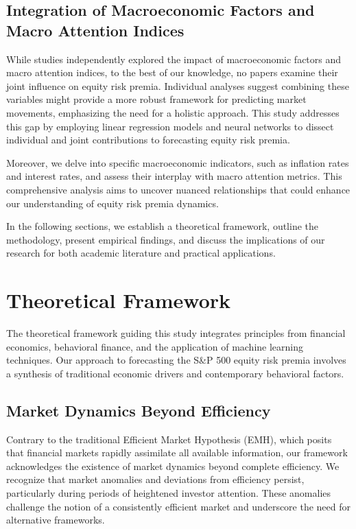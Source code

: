 \documentclass{article}
\begin{document}
\subsection{Integration of Macroeconomic Factors and Macro Attention Indices}

While studies independently explored the impact of macroeconomic factors and macro attention indices, to the best of our knowledge, no papers examine their joint influence on equity risk premia. Individual analyses suggest combining these variables might provide a more robust framework for predicting market movements, emphasizing the need for a holistic approach. This study addresses this gap by employing linear regression models and neural networks to dissect individual and joint contributions to forecasting equity risk premia.

Moreover, we delve into specific macroeconomic indicators, such as inflation rates and interest rates, and assess their interplay with macro attention metrics. This comprehensive analysis aims to uncover nuanced relationships that could enhance our understanding of equity risk premia dynamics.

In the following sections, we establish a theoretical framework, outline the methodology, present empirical findings, and discuss the implications of our research for both academic literature and practical applications.

\newpage

\section{Theoretical Framework}

The theoretical framework guiding this study integrates principles from financial economics, behavioral finance, and the application of machine learning techniques. Our approach to forecasting the S\&P 500 equity risk premia involves a synthesis of traditional economic drivers and contemporary behavioral factors.

\subsection{Market Dynamics Beyond Efficiency}

Contrary to the traditional Efficient Market Hypothesis (EMH), which posits that financial markets rapidly assimilate all available information, our framework acknowledges the existence of market dynamics beyond complete efficiency. We recognize that market anomalies and deviations from efficiency persist, particularly during periods of heightened investor attention. These anomalies challenge the notion of a consistently efficient market and underscore the need for alternative frameworks.
\end{document}
